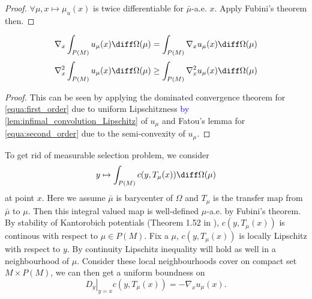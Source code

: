 \begin{proof}
	$\forall \mu, x \mapsto \mu_u(x)$ is twice differentiable for $\bar{\mu}$-a.e. $x$. Apply Fubini's theorem then.
\end{proof}

\begin{prop} 
	\begin{equation}
		\label{equa:first_order}
		\nabla _ { x } \int _ { P ( M ) } u _ { \mu } ( x ) \diff \Omega ( \mu ) = \int _ { P ( M ) } \nabla _ { x } u _ { \mu } ( x ) \diff \Omega ( \mu )
	\end{equation}
	\begin{equation}
		\label{equa:second_order}
		\nabla _ { x } ^ { 2 } \int _ { P ( M ) } u _ { \mu } ( x ) \diff \Omega ( \mu ) \geq \int _ { P ( M ) } \nabla _ { x } ^ { 2 } u _ { \mu } ( x ) \diff \Omega ( \mu )
	\end{equation}
\end{prop}

\begin{proof}
	This can be seen by applying the dominated convergence theorem for \cref{equa:first_order} due to uniform Lipschitzness \textcolor{blue}{by \cref{lem:infimal_convolution_Lipschitz}} of \( u _ { \mu } \) and Fatou's lemma for \cref{equa:second_order} due to the semi-convexity
	of \( u _ { \mu } . \)
\end{proof}

To get rid of measurable selection problem, we consider
\[ y \mapsto \int_{P(M)} c(y, T_{\mu}(x)) \diff \Omega ( \mu)\]
at point $x$.
Here we assume $\bar{\mu}$ is barycenter of $\Omega$ and $T_{\mu}$ is the transfer map from $\bar{\mu}$ to $\mu$.
Then this integral valued map is well-defined $\mu$-a.e. by Fubini's theorem.
By stability of Kantorobich potentials (Theorem 1.52 in \cite{Santambrogio2015}), $c(y, T_{\mu}(x))$ is continous with respect to $\mu \in P(M)$.
Fix a $\mu$, $c(y, T_{\mu}(x))$ is locally Lipschitz with respect to $y$.
By continuity Lipschitz inequality will hold as well in a neighbourhood of $\mu$.
Consider these local neighbourhoods cover on compact set $ M \times P(M)$,
we can then get a uniform boundness on
\[\left. D_y\right|_{y=x} c(y, T_{\mu}(x)) = - \nabla_x u_{\mu}(x).\]

